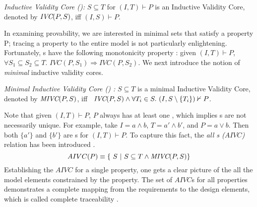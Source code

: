 %


\begin{definition}{\emph{Inductive Validity Core (\ivc)\cite{Ghass16}:}}
  \label{def:ivc}
  $S \subseteq T$ for $(I, T)\vdash P$ is an Inductive Validity Core,
  denoted by $\textit{IVC}(P, S)$, iff $(I, S) \vdash P $.
\end{definition}

In examining provability, we are interested in minimal sets
that satisfy a property P; tracing a property to the entire model
is not particularly enlightening.  Fortunately, \ivc s have
the following monotonicity property \cite{Ghass16}: given $(I, T)\vdash P$, $\forall S_1 \subseteq S_2 \subseteq T$. $IVC(P, S_1) \Rightarrow IVC(P, S_2)$.  We next introduce the notion of {\em minimal} inductive validity cores.

\begin{definition}{\emph{Minimal Inductive Validity Core (\mivc) \cite{Ghass16}:}}
  \label{def:minimal-ivc}
  $S \subseteq T$ is a minimal Inductive Validity Core,
  denoted by $\textit{MIVC}(P, S)$, iff ~$\textit{IVC}(P, S) \wedge \forall T_i \in S.~ (I, S\setminus\{ T_i \}) \nvdash P$.
\end{definition}

Note that given $(I, T) \vdash P$, $P$ always has at least one \mivc , which implies \mivc s are not necessarily unique.
For example, take $I = a \land b$, $T = a' \land b'$, and $P = a \lor
b$. Then both $\{a'\}$ and $\{b'\}$ are \mivc s for $(I, T)\vdash P$. To capture this fact, the \emph{all \mivc s ($AIVC$)} relation has been introduced \cite{Murugesan16:renext}.
$$ AIVC(P) \equiv  \{\ S~|~S \subseteq T \land  \textit{MIVC}(P, S)\} $$
\noindent
Establishing the $AIVC$ for a single property, one gets a clear picture of the all the model elements constrained by the property. The set of $AIVC$s for all properties demonstrates a complete mapping from the requirements to the design elements, which is called complete traceability \cite{Murugesan16:renext}.

